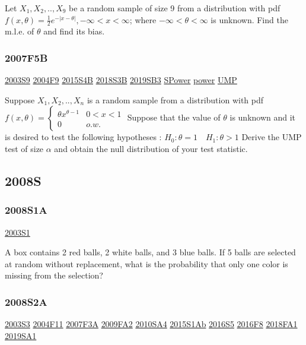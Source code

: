 \documentclass[10pt,twocolumn,portrait]{article}
\begin{document}
Let \(X_1,X_2,..,X_9\) be a random sample of size 9 from a distribution
with pdf \(f(x,\theta) =\frac12e^{-|x-\theta|}, -\infty<x<\infty\);
where \(-\infty<\theta<\infty\) is unknown. Find the m.l.e. of
\(\theta\) and find its bias.

\hypertarget{f5b}{%
\subsubsection{2007F5B}\label{f5b}}

\protect\hyperlink{s9}{2003S9} \protect\hyperlink{f9-2}{2004F9}
\protect\hyperlink{s4b-1}{2015S4B} \protect\hyperlink{s3b-2}{2018S3B}
\protect\hyperlink{sb3-3}{2019SB3} \protect\hyperlink{SPower}{SPower}
\protect\hyperlink{power}{power} \protect\hyperlink{section-7}{UMP}

Suppose \(X_1,X_2,..,X_n\) is a random sample from a distribution with
pdf
\(f(x,\theta)=\begin{cases}\theta x^{\theta-1}& 0<x<1\\0& o.w.\end{cases}\)
Suppose that the value of \(\theta\) is unknown and it is desired to
test the following hypotheses : \(H_0:\theta=1\quad H_1 :\theta>1\)
Derive the UMP test of size \(\alpha\) and obtain the null distribution
of your test statistic.

\hypertarget{s-2}{%
\subsection{2008S}\label{s-2}}

\hypertarget{s1a}{%
\subsubsection{2008S1A}\label{s1a}}

\protect\hyperlink{s1}{2003S1}

A box contains 2 red balls, 2 white balls, and 3 blue balls. If 5 balls
are selected at random without replacement, what is the probability that
only one color is missing from the selection?

\hypertarget{s2a}{%
\subsubsection{2008S2A}\label{s2a}}

\protect\hyperlink{s3}{2003S3} \protect\hyperlink{f11}{2004F11}
\protect\hyperlink{f3a}{2007F3A} \protect\hyperlink{fa2}{2009FA2}
\protect\hyperlink{sa4-1}{2010SA4} \protect\hyperlink{s1ab}{2015S1Ab}
\protect\hyperlink{s5-4}{2016S5} \protect\hyperlink{f8-4}{2016F8}
\protect\hyperlink{fa1-4}{2018FA1} \protect\hyperlink{sa1-3}{2019SA1}
\end{document}
